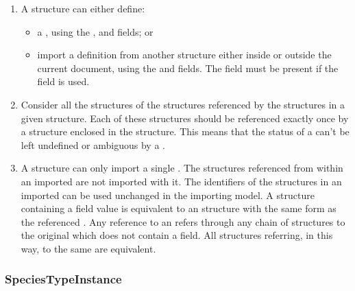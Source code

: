 \documentclass{cekarticle}
\begin{document}
\begin{enumerate}

\item A  structure can either define:

\begin{itemize}

\item a , using the
,  and
 fields; or

\item import a definition from another 
structure either inside or outside the current document, using the
 and  fields.  The  field
must be present if the  field is used.

\end{itemize}

\item Consider all the  structures of the
 structures referenced by the 
 structures in a given 
structure. Each of these  structures should be
referenced exactly once by a 
structure enclosed in the  structure.  This
means that the status of a  can't be left
undefined or ambiguous by a .

\item A  structure can only import a single
.  The  structures
referenced from within an imported  are not
imported with it.  The identifiers of the 
structures in an imported  can be used
unchanged in the importing model. A  structure
containing a  field value is equivalent to an
 structure with the same form as the referenced
.  Any reference to an 
refers through any chain of  structures to the
original  which does not contain a
 field. All  structures referring,
in this way, to the same  are equivalent.

\end{enumerate}

\subsubsection{SpeciesTypeInstance}
\end{document}
